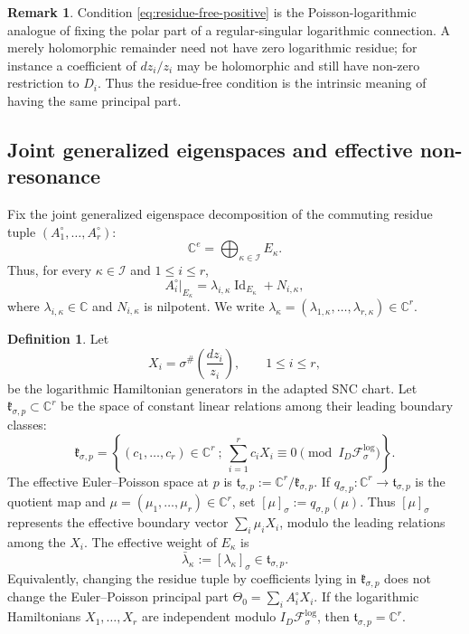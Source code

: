\documentclass[11pt]{amsart}
\theoremstyle{plain}
\theoremstyle{definition}
\newtheorem{definition}[theorem]{Definition}
\newtheorem{remark}[theorem]{Remark}
\DeclareMathOperator{\Id}{Id}
\newcommand{\fol}{\mathcal{F}}
\theoremstyle{definition}
\newcommand{\C}{\mathbb{C}}
\begin{document}
\begin{remark}\label{rem:fixed-principal-part-not-weakening}
Condition \eqref{eq:residue-free-positive} is the Poisson-logarithmic analogue of fixing the polar part of a regular-singular logarithmic connection.  A merely holomorphic remainder need not have zero logarithmic residue; for instance a coefficient of $dz_i/z_i$ may be holomorphic and still have non-zero restriction to $D_i$.  Thus the residue-free condition is the intrinsic meaning of having the same principal part.
\end{remark}


\subsection{Joint generalized eigenspaces and effective non-resonance}

Fix the joint generalized eigenspace decomposition of the commuting residue tuple
$(A_1^\circ,\ldots,A_r^\circ)$:
\[
        \C^e=\bigoplus_{\kappa\in\mathcal I}E_\kappa .
\]
Thus, for every $\kappa\in\mathcal I$ and $1\le i\le r$,
\[
        A_i^\circ|_{E_\kappa}=\lambda_{i,\kappa}\Id_{E_\kappa}+N_{i,\kappa},
\]
where $\lambda_{i,\kappa}\in\C$ and $N_{i,\kappa}$ is nilpotent.  We write
$\lambda_\kappa=(\lambda_{1,\kappa},\ldots,\lambda_{r,\kappa})\in\C^r$.

\begin{definition}\label{def:effective-ep-quotient}
Let
\[
        X_i=\sigma^\#\!\left(\frac{dz_i}{z_i}\right),
        \qquad 1\le i\le r,
\]
be the logarithmic Hamiltonian generators in the adapted SNC chart.  Let
$\mathfrak k_{\sigma,p}\subset\C^r$ be the space of constant linear relations
among their leading boundary classes:
\[
        \mathfrak k_{\sigma,p}
        =
        \left\{
        (c_1,\ldots,c_r)\in\C^r
        \ ;\
        \sum_{i=1}^r c_iX_i
        \equiv
        0
        \pmod {I_D\fol^{\log}_\sigma}
        \right\}.
\]
The effective Euler--Poisson space at $p$ is
$\mathfrak t_{\sigma,p}:=\C^r/\mathfrak k_{\sigma,p}$.  If
$q_{\sigma,p}:\C^r\to\mathfrak t_{\sigma,p}$ is the quotient map and
$\mu=(\mu_1,\ldots,\mu_r)\in\C^r$, set
$[\mu]_\sigma:=q_{\sigma,p}(\mu)$.  Thus $[\mu]_\sigma$ represents the effective
boundary vector $\sum_i\mu_iX_i$, modulo the leading relations among the
$X_i$.
The effective weight of $E_\kappa$ is
\[
        \bar\lambda_\kappa:=[\lambda_\kappa]_\sigma
        \in\mathfrak t_{\sigma,p}.
\]
Equivalently, changing the residue tuple by coefficients lying in
$\mathfrak k_{\sigma,p}$ does not change the Euler--Poisson principal part
$\Theta_0=\sum_iA_i^\circ X_i$.  If the logarithmic Hamiltonians
$X_1,\ldots,X_r$ are independent modulo $I_D\fol_\sigma^{\log}$, then
$\mathfrak t_{\sigma,p}=\C^r$.
\end{definition}
\end{document}
